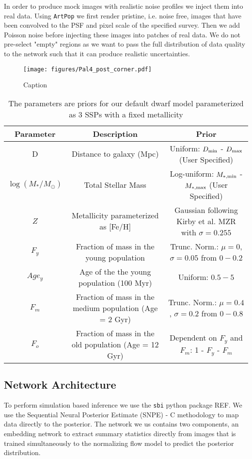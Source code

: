 \documentclass[twocolumn]{aastex631}
\newcommand{\artpop}[0]{\texttt{ArtPop}}
\newcommand{\sbi}[0]{\texttt{sbi}}
\begin{document}
In order to produce mock images with realistic noise profiles we inject them into real data. Using \artpop{} we first render pristine, i.e. noise free, images that have been convolved to the PSF and pixel scale of the specified survey. Then we add Poisson noise before injecting these images into patches of real data. We do not pre-select "empty" regions as we want to pass the full distribution of data quality to the network such that it can produce realistic uncertainties.
\begin{figure*}
    \centering
    \texttt{[image: figures/Pal4\_post\_corner.pdf]}
    \caption{Caption}
    \label{fig:Pal4}
\end{figure*}

\begin{table*}
    \centering
    \caption{The parameters are priors for our default dwarf model parameterized as 3 SSPs with a fixed metallicity}
    \small
    \begin{tabular}{c c c} 
        Parameter & Description & Prior \\  \hline \hline
         D & Distance to galaxy (Mpc) & Uniform: $D_{\rm min}$ -  $D_{\rm max}$ (User Specified) \\
         $\log (M_*/M_\odot)$ & Total Stellar Mass & Log-uniform: $M_{\rm*, min}$ -  $M_{\rm* , max}$ (User Specified) \\
         $Z$ & Metallicity parameterized as [Fe/H] & Gaussian following Kirby et al. MZR with $\sigma = 0.255$ \\
         $F_{y}$& Fraction of mass in the young population & Trunc. Norm.: $\mu=0$, $\sigma=0.05$ from $0-0.2$\\
         $Age_{y}$& Age of the the young population (100 Myr) & Uniform: $0.5-5$\\
         $F_{m}$& Fraction of mass in the medium population (Age = 2 Gyr) & Trunc. Norm.: $\mu=0.4$, $\sigma=0.2$ from $0-0.8$\\
         $F_{o}$& Fraction of mass in the old population (Age = 12 Gyr) & Dependent on $F_{y}$ and $F_{m}$: 1 - $F_{y}$ - $F_{m}$\\ \hline  
    \end{tabular}
    \label{tab:dwarf_model}
\end{table*}

\subsection{Network Architecture}
\label{sec:NN}
To perform simulation based inference we use the \sbi{} python package {REF}. We use the Sequential Neural Posterior Estimate (SNPE) - C methodology to map data directly to the posterior. The network we us contains two components, an embedding network to extract summary statistics directly from images that is trained simultaneously to the normalizing flow model to predict the posterior distribution. 
\end{document}
